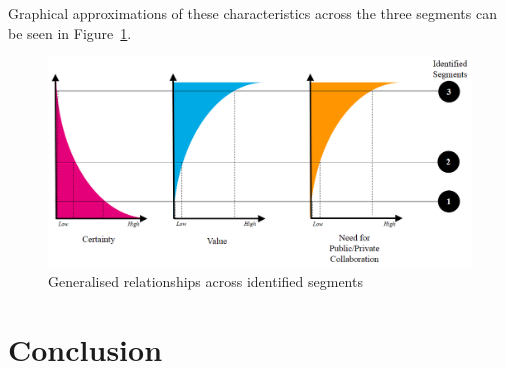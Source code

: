\documentclass[journal]{IEEEtran}
\begin{document}
Graphical approximations of these characteristics across the three
segments can be seen in Figure~\ref{fig:segmentcharacteristics}.

\begin{figure}[!htb]
\centering
\includegraphics[width=\columnwidth]{images/segmentcharacteristics.png}
\caption{Generalised relationships across identified segments}
\label{fig:segmentcharacteristics}
\end{figure}




 



\section{Conclusion}\label{conclusion}
\end{document}
